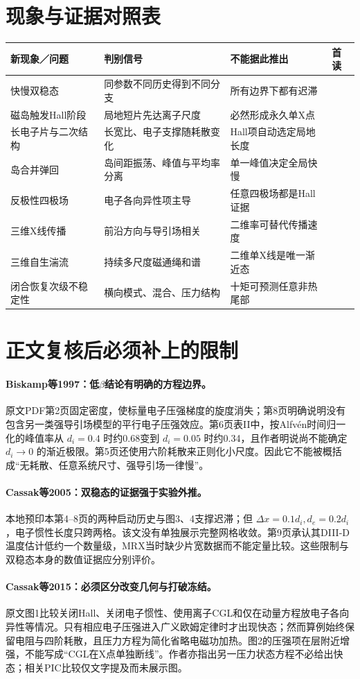 \section{现象与证据对照表}
\begin{longtable}{P{36mm}P{44mm}P{41mm}P{28mm}}
\toprule 新现象／问题 & 判别信号 & 不能据此推出 & 首读\\\midrule
快慢双稳态 & 同参数不同历史得到不同分支 & 所有边界下都有迟滞 & \cite{Cassak2005,Cassak2010}\\
磁岛触发Hall阶段 & 局地短片先达离子尺度 & 必然形成永久单X点 & \cite{Huang2011}\\
长电子片与二次结构 & 长宽比、电子支撑随耗散变化 & Hall项自动选定局地长度 & \cite{Sullivan2009}\\
岛合并弹回 & 岛间距振荡、峰值与平均率分离 & 单一峰值决定全局快慢 & \cite{Knoll2006,Ng2015}\\
反极性四极场 & 电子各向异性项主导 & 任意四极场都是Hall证据 & \cite{Cassak2015}\\
三维X线传播 & 前沿方向与导引场相关 & 二维率可替代传播速度 & \cite{Shepherd2012}\\
三维自生湍流 & 持续多尺度磁通绳和谱 & 二维单X线是唯一渐近态 & \cite{Huang2024}\\
闭合恢复次级不稳定性 & 横向模式、混合、压力结构 & 十矩可预测任意非热尾部 & \cite{Closure2026}\\\bottomrule
\end{longtable}
\section{正文复核后必须补上的限制}
\paragraph{Biskamp等1997：低$\beta$结论有明确的方程边界。}
原文PDF第2页固定密度，使标量电子压强梯度的旋度消失；第8页明确说明没有包含另一类强导引场模型的平行电子压强效应。第6页表II中，按Alfvén时间归一化的峰值率从 $d_i=0.4$ 时约0.68变到 $d_i=0.05$ 时约0.34，且作者明说尚不能确定 $d_i\to0$ 的渐近极限。第5页还使用六阶耗散来正则化小尺度。因此它不能被概括成“无耗散、任意系统尺寸、强导引场一律慢”。\citep{Biskamp1997}

\paragraph{Cassak等2005：双稳态的证据强于实验外推。}
本地预印本第4--8页的两种启动历史与图3、4支撑迟滞；但 $\Delta x=0.1d_i,d_e=0.2d_i$，电子惯性长度只跨两格。该文没有单独展示完整网格收敛。第9页承认其DIII-D温度估计低约一个数量级，MRX当时缺少片宽数据而不能定量比较。这些限制与双稳态本身的数值证据应分别评价。\citep{Cassak2005}

\paragraph{Cassak等2015：必须区分改变几何与打破冻结。}
原文图1比较关闭Hall、关闭电子惯性、使用离子CGL和仅在动量方程放电子各向异性等情况。只有相应电子压强进入广义欧姆定律时才出现快态；然而算例始终保留电阻与四阶耗散，且压力方程为简化省略电磁功加热。图2的压强项在层附近增强，不能写成“CGL在X点单独断线”。作者亦指出另一压力状态方程不必给出快态；相关PIC比较仅文字提及而未展示图。\citep{Cassak2015}
